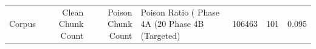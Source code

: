 \begin{tabular}{lrrll}
\toprule
Corpus & Clean Chunk Count & Poison Chunk Count & Poison Ratio (%
\midrule
Phase 4A (20%
Phase 4B (Targeted) & 106463 & 101 & 0.095%
\bottomrule
\end{tabular}

